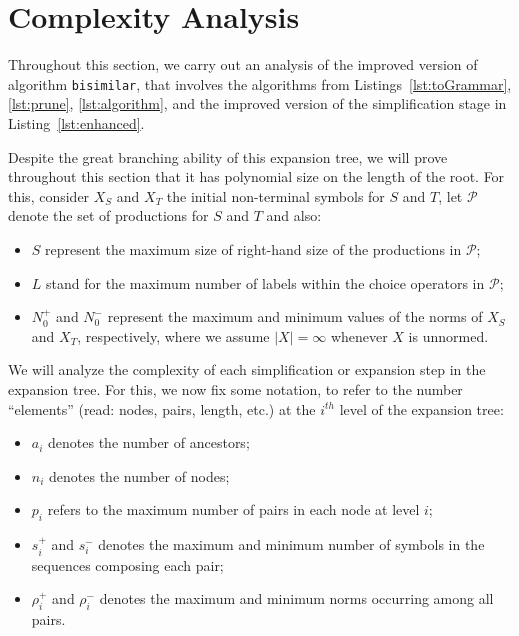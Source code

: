 \section{Complexity Analysis}
\label{sec:complexity}

Throughout this section, we carry out an analysis of the
improved version of algorithm \lstinline{bisimilar},
that involves the algorithms from Listings~\ref{lst:toGrammar},
\ref{lst:prune}, \ref{lst:algorithm}, and the improved version
of the simplification stage in Listing~\ref{lst:enhanced}.



Despite the great branching ability of this expansion tree, 
we will prove throughout this section that it has polynomial 
size on the length of the root. For this, consider $X_S$ and
$X_T$ the initial non-terminal symbols for $S$ and $T$, let 
$\mathcal{P}$ denote the set of productions for $S$ and $T$ and 
also:
\begin{itemize}
	\item $S$ represent the maximum size of right-hand size of
		  the productions in $\mathcal{P}$;
	\item $L$ stand for the maximum number of labels within the choice 
		  operators in $\mathcal{P}$;
	\item $N_0^+$ and $N_0^-$ represent the maximum and minimum values
		  of the norms of $X_S$ and $X_T$, respectively, where we 
		  assume $|X|=\infty$ whenever $X$ is unnormed.
\end{itemize}

We will analyze the complexity of each simplification or expansion 
step in the expansion tree. For this, we now fix some notation, to 
refer to the number ``elements'' (read: nodes, pairs, length, etc.)
at the $i^{th}$ level of the expansion tree:
\begin{itemize}
	\item $a_i$ denotes the number of ancestors;
	\item $n_i$ denotes the number of nodes;
	\item $p_i$ refers to the maximum number of pairs in each node
				at level $i$;
	\item $s_i^+$ and $s_i^-$ denotes the maximum and minimum 
		  number of symbols in the sequences composing each pair;
	\item $\rho_i^+$ and $\rho_i^-$ denotes the maximum and minimum
		  norms occurring among all pairs.
\end{itemize}

